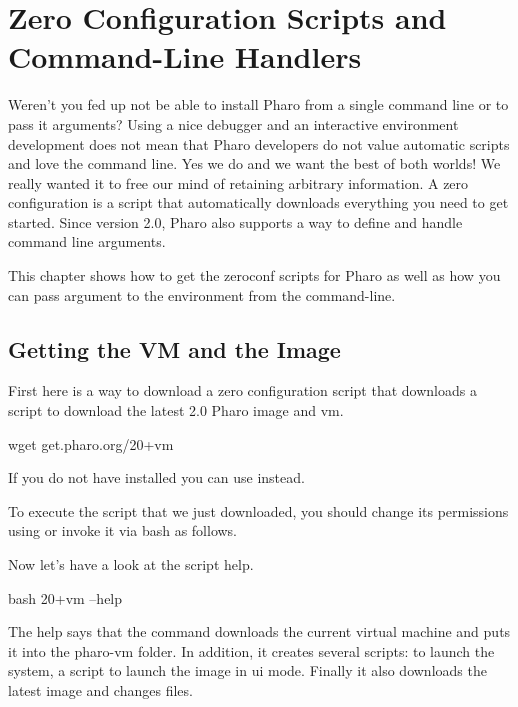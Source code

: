 \documentclass[a4paper,10pt,twoside]{book}
\begin{document}
\fi
\sloppy

\chapter{Zero Configuration Scripts and Command-Line Handlers}



Weren't you fed up not be able to install Pharo from a single command line or to pass it arguments? 
Using a nice debugger and an interactive environment development does not 
mean that Pharo developers do not value automatic scripts and love the command line.
Yes we do and we want the best of both worlds! We really wanted it to free our mind of retaining arbitrary information. A zero configuration is a script that automatically downloads everything you need to get started. Since version 2.0, Pharo also supports a way to define and handle command line arguments. 

This chapter shows how to get the zeroconf scripts for Pharo as well as how you can pass argument to the environment from the command-line.


\section{Getting the VM and the Image}
First here is a way to download a zero configuration script that downloads a script to download the latest 2.0 Pharo image and vm. 

\begin{code}{}
wget get.pharo.org/20+vm
\end{code}

If you do not have  installed you can use  instead.

To execute the script that we just downloaded, you should change its permissions using   or invoke it via bash as follows. 

Now let's have a look at the script help.

\begin{code}{}
bash 20+vm --help 
\end{code}


The help says that the  command downloads the current virtual machine and puts it into the pharo-vm folder. In addition, it creates several scripts:  to launch the system,  a script to launch the image in ui mode. Finally it also downloads the latest image and changes files.
\end{document}
